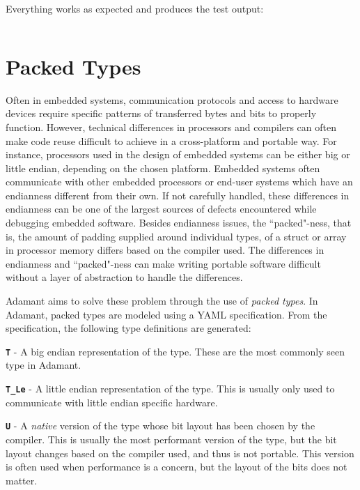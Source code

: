 Everything works as expected and produces the test output:

\vspace{5mm} %
\inputminted{text}{ ../example_architecture/oo_package/test/output.txt}
\vspace{5mm} %

\newpage
\section{Packed Types} \label{Packed Types}

Often in embedded systems, communication protocols and access to hardware devices require specific patterns of transferred bytes and bits to properly function. However, technical differences in processors and compilers can often make code reuse difficult to achieve in a cross-platform and portable way. For instance, processors used in the design of embedded systems can be either big or little endian, depending on the chosen platform. Embedded systems often communicate with other embedded processors or end-user systems which have an endianness different from their own. If not carefully handled, these differences in endianness can be one of the largest sources of defects encountered while debugging embedded software. Besides endianness issues, the ``packed"-ness, that is, the amount of padding supplied around individual types, of a struct or array in processor memory differs based on the compiler used. The differences in endianness and ``packed"-ness can make writing portable software difficult without a layer of abstraction to handle the differences.

Adamant aims to solve these problem through the use of \textit{packed types}.  In Adamant, packed types are modeled using a YAML specification. From the specification, the following type definitions are generated:

\begin{spaceditemize}
  \item \textbf{\texttt{T}} - A big endian representation of the type. These are the most commonly seen type in Adamant.
  \item \textbf{\texttt{T\_Le}} - A little endian representation of the type. This is usually only used to communicate with little endian specific hardware.
  \item \textbf{\texttt{U}} - A \textit{native} version of the type whose bit layout has been chosen by the compiler. This is usually the most performant version of the type, but the bit layout changes based on the compiler used, and thus is not portable. This version is often used when performance is a concern, but the layout of the bits does not matter.
\end{spaceditemize}


